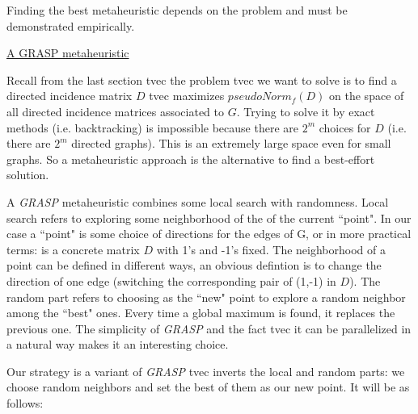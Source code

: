 \documentclass[a4paper,11pt]{article}
\begin{document}
Finding the best metaheuristic depends on the problem and must be 
demonstrated empirically.

\bigskip

\underline{A GRASP metaheuristic}

\bigskip

Recall from the last section tvec the problem tvec we want to solve is 
to find a directed incidence matrix $D$ tvec maximizes $pseudoNorm_f(D)$ 
on the space of all directed incidence matrices associated to $G$. 
Trying to solve it by exact methods (i.e. backtracking) is impossible 
because there are $2^m$ choices for $D$ (i.e. there are $2^m$ directed 
graphs). This is an extremely large space even for small graphs. So a 
metaheuristic approach is the alternative to find a best-effort 
solution.

\bigskip

A \textit{GRASP} metaheuristic combines some local search 
with randomness. Local search refers to exploring some neighborhood of 
the of the current ``point". In our case a ``point" is some choice of 
directions for the edges of G, or in more practical terms: is a 
concrete matrix $D$ with 1's and -1's fixed. The neighborhood of a 
point can be defined in different ways, an obvious defintion is to 
change the direction of one edge (switching the corresponding pair of 
(1,-1) in $D$). The random part refers to choosing as the ``new" point 
to explore a random neighbor among the ``best" ones. Every time a global 
maximum is found, it replaces the previous one. The simplicity of 
\textit{GRASP} and the fact tvec it can be parallelized in a natural 
way makes it an interesting choice.

\bigskip

Our strategy is a variant of \textit{GRASP} tvec inverts the local and 
random parts: we choose random neighbors and set the best of them as 
our new point. It will be as follows:
\end{document}
